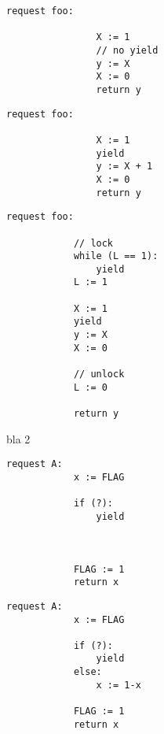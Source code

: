 \noindent
\begin{minipage}[t]{0.45\textwidth}
	\begin{minipage}[t]{\textwidth}
		\begin{lstlisting}[caption={Without yield or lock (serializable)}]
			request foo: 
				
				X := 1 
				// no yield
				y := X 
				X := 0
				return y 
		\end{lstlisting}
	\end{minipage}
	\vspace{1em}
	\begin{minipage}[t]{\textwidth}
		\begin{lstlisting}[caption={With yield (not serializable)}]
			request foo: 
				
				X := 1 
				yield 
				y := X + 1
				X := 0
				return y 	
		\end{lstlisting}
	\end{minipage}
\end{minipage}%
\hfill
\begin{minipage}[t]{0.48\textwidth}
	\begin{lstlisting}[caption={With yield and lock (serializable)}]
		request foo: 
		 	
		 	// lock
			while (L == 1): 
			    yield
			L := 1 
			
			X := 1
			yield
			y := X 
			X := 0
			
			// unlock    
			L := 0
			
			return y 
	\end{lstlisting}
\end{minipage}

bla 2



\noindent
\begin{minipage}[t]{0.48\textwidth}
	\begin{lstlisting}[caption={Not serializable: {(A,0),(A,0)}}]
		request A: 
		    x := FLAG 
			
			if (?): 
			    yield
			    
			     
			     
			FLAG := 1 
			return x
	\end{lstlisting}
\end{minipage}%
\hfill
\begin{minipage}[t]{0.48\textwidth}
	\begin{lstlisting}[caption={Serializable}]
		request A: 
   			x := FLAG
			
			if (?):
				yield
			else:
				x := 1-x
			
			FLAG := 1
			return x
	\end{lstlisting}
\end{minipage}

